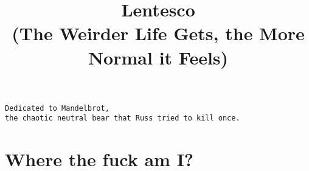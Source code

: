 \documentclass[12pt]{report}
\title{\textbf{Lentesco} \\ \vspace{1em} 
\small{(The Weirder Life Gets, the More Normal it Feels)}}
\begin{document}
\maketitle
\newpage \vspace*{6cm}
\thispagestyle{empty}
\begin{center}
\texttt{Dedicated to Mandelbrot, \\ the chaotic neutral bear
that Russ tried to kill once.}
\end{center}
\chapter*{Where the fuck am I?}

\end{document}
